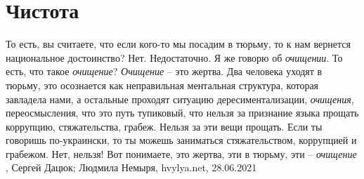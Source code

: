  
 
 
 
 
\chapter{Чистота}
\label{sec:slova.chistota}

То есть, вы считаете, что если кого-то мы посадим в тюрьму, то к нам вернется
национальное достоинство?  Нет. Недостаточно. Я же говорю об \emph{очищении}. То есть,
что такое \emph{очищение}? \emph{Очищение} – это жертва. Два человека уходят в тюрьму, это
осознается как неправильная ментальная структура, которая завладела нами, а
остальные проходят ситуацию дересиментализации, \emph{очищения}, переосмысления, что
это путь тупиковый, что нельзя за признание языка прощать коррупцию,
стяжательства, грабеж. Нельзя за эти вещи прощать. Если ты говоришь
по-украински, то ты можешь заниматься стяжательством, коррупцией и грабежом.
Нет, нельзя! Вот понимаете, это жертва, эти в тюрьму, эти – \emph{очищение}
, 
Сергей Дацюк; Людмила Немыря, hvylya.net, 28.06.2021

